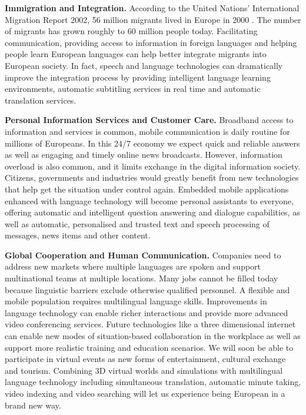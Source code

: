 \documentclass[10pt, plain]{../../metanetpaper}
\begin{document}
\begin{multicols}{2}
\textbf{Immigration and Integration.} According to the United Nations' International Migration Report 2002, 56 million migrants lived in Europe in 2000 \cite{UN1}. The number of migrants has grown roughly to 60 million people today. Facilitating communication, providing access to information in foreign languages and helping people learn European languages can help better integrate migrants into European society. In fact, speech and language technologies can dramatically improve the integration process by providing intelligent language learning environments, automatic subtitling services in real time and automatic translation services.

\textbf{Personal Information Services and Customer Care.} Broadband access to information and services is common, mobile communication is daily routine for millions of Europeans. In this 24/7 economy we expect quick and reliable answers as well as engaging and timely online news broadcasts. However, information overload is also common, and it limits exchange in the digital information society. Citizens, governments and industries would greatly benefit from new technologies that help get the situation under control again. Embedded mobile applications enhanced with language technology will become personal assistants to everyone, offering automatic and intelligent question answering and dialogue capabilities, as well as automatic, personalised and trusted text and speech processing of messages, news items and other content.

\textbf{Global Cooperation and Human Communication.} Companies need to address new markets where multiple languages are spoken and support multinational teams at multiple locations. Many jobs cannot be filled today because linguistic barriers exclude otherwise qualified personnel. A flexible and mobile population requires multilingual language skills. Improvements in language technology can enable richer interactions and provide more advanced video conferencing services. Future technologies like a three dimensional internet can enable new modes of situation-based collaboration in the workplace as well as support more realistic training and education scenarios. We will soon be able to participate in virtual events as new forms of entertainment, cultural exchange and tourism. Combining 3D virtual worlds and simulations with multilingual language technology including simultaneous translation, automatic minute taking, video indexing and video searching will let us experience being European in a brand new way.


\end{multicols}
\end{document}

